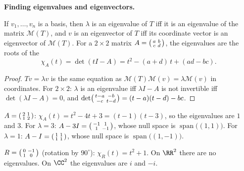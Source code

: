 \documentclass[10pt]{scrartcl}
\DeclareMathOperator{\spn}{span}
\newcommand{\MM}{\mathcal M}
\begin{document}
\noindent\textbf{Finding eigenvalues and eigenvectors.}
\begin{proposition*}[Prop.~56]
  If $v_1,\dots,v_n$ is a basis, then $\lambda$ is an eigenvalue of $T$ iff it is an eigenvalue of the matrix $\MM(T)$, and $v$ is an eigenvector of $T$ iff its coordinate vector is an eigenvector of $\MM(T)$. For a $2\times2$ matrix $A=\begin{psmallmatrix}a&b\\c&d\end{psmallmatrix}$, the eigenvalues are the roots of the 
  \[ \chi_A(t)=\det(tI-A)=t^2-(a+d)\,t+(ad-bc). \]
\end{proposition*}
\begin{proof}
  $Tv=\lambda v$ is the same equation as $\MM(T)\MM(v)=\lambda\MM(v)$ in coordinates. For $2\times2$: $\lambda$ is an eigenvalue iff $\lambda I-A$ is not invertible iff $\det(\lambda I-A)=0$, and $\det\begin{psmallmatrix}t-a&-b\\-c&t-d\end{psmallmatrix}=(t-a)(t-d)-bc$.
\end{proof}

\begin{example*}
  $A=\begin{psmallmatrix}2&1\\1&2\end{psmallmatrix}$: $\chi_A(t)=t^2-4t+3=(t-1)(t-3)$, so the eigenvalues are $1$ and $3$.
  For $\lambda=3$: $A-3I=\begin{psmallmatrix}-1&1\\1&-1\end{psmallmatrix}$, whose null space is $\spn\big((1,1)\big)$. For $\lambda=1$: $A-I=\begin{psmallmatrix}1&1\\1&1\end{psmallmatrix}$, whose null space is $\spn\big((1,-1)\big)$.
\end{example*}

\begin{example*}[Ex.~51: rotation]
  $R=\begin{psmallmatrix}0&-1\\1&0\end{psmallmatrix}$ (rotation by $90^\circ$): $\chi_R(t)=t^2+1$. On $\RR^2$ there are no eigenvalues. On $\CC^2$ the eigenvalues are $i$ and $-i$.
\end{example*}
\end{document}
